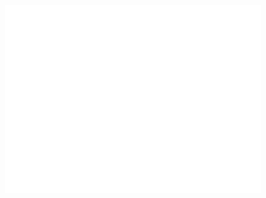 \documentclass{../lab}
\begin{document}
\begin{figure}[H]
  \includegraphics[width=\linewidth,keepaspectratio]{images/empty.png}
\endminipage
\end{figure}
\end{document}
